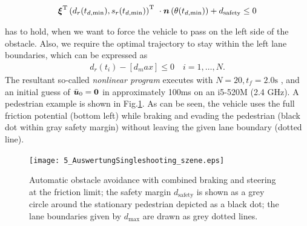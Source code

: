 \begin{align*}
\boldsymbol{\xi}^{{\rm T}}\left(d_r(t_{d,\mathrm{min}}),s_r(t_{d,\mathrm{min}})\right)^{{\rm T}} \ \cdot \boldsymbol{n}\left(\theta(t_{d,\mathrm{min}})\right) +d_\mathrm{safety} \leq 0
\end{align*}

has to hold, when we want to force the vehicle to pass on the left side of the obstacle. 
Also, we require the optimal trajectory to stay within the left lane boundaries, which can be expressed as
\begin{align*}
d_r(t_i) - \left[ d_max \right] \leq 0 \quad i=1,\dots,N.
\end{align*}
The resultant so-called \emph{nonlinear program} executes with $N=20, t_f=2.0\mathrm{s}$ , and an initial guess of $\bar{\boldsymbol{u}}_0=\boldsymbol{0}$ in approximately 100ms  on an i5-520M (2.4 GHz). A pedestrian example is shown in Fig.\ref{fig:fussgaenger_draufsicht}. As can be seen, the vehicle uses the full friction potential (bottom left) while braking and evading the pedestrian (black dot within gray safety margin) without leaving the given lane boundary (dotted line).
\begin{figure}[h]
	\centering
	
	\renewcommand{\matlabtextA}{\scriptsize}
	\texttt{[image: 5\_AuswertungSingleshooting\_szene.eps]}		
    \caption[Combined braking and steering]{Automatic obstacle avoidance with combined braking and steering at the friction limit; the safety margin $d_\mathrm{safety}$  is shown as a grey circle around the stationary pedestrian depicted as a black dot; the lane boundaries given by $d_\mathrm{max}$  are drawn as grey dotted lines.}
    \label{fig:fussgaenger_draufsicht}
\end{figure}

%	


